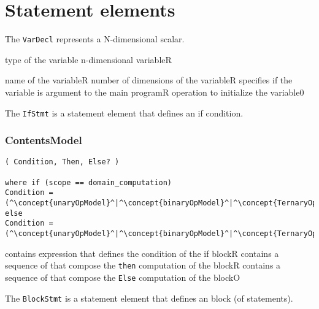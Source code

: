 \section{Statement elements}


The {\tt VarDecl} represents a N-dimensional scalar.

\begin{HIRChildElements}
	{type of the variable n-dimensional variable}{R}
\end{HIRChildElements}

\begin{HIRAttributes}
	{name of the variable}{R}
	{number of dimensions of the variable}{R}
    {specifies if the variable is argument to the main program}{R}
	{operation to initialize the variable}{0}
\end{HIRAttributes}

The {\tt IfStmt} is a statement element that defines an if condition.

\subsubsection*{ContentsModel}{}

\begin{lstlisting}[style=default,frame=none]
( Condition, Then, Else? )

where if (scope == domain_computation)
Condition = (^\concept{unaryOpModel}^|^\concept{binaryOpModel}^|^\concept{TernaryOp}^|^\concept{FieldAccess}^|^\concept{VarAccess}^|^\concept{Literal}^|^\irrconcept{NeighbourReduce}^)
else
Condition = (^\concept{unaryOpModel}^|^\concept{binaryOpModel}^|^\concept{TernaryOp}^|^\concept{VarAccess}^|^\concept{Literal}^)
\end{lstlisting}

\begin{HIRChildElements}
	{contains expression that defines the condition of the if block}{R}
	{contains a sequence of  that compose the {\tt then} 
	 computation of the block}{R}
	{contains a sequence of  that compose the {\tt Else} 
	 computation of the block}{O}
\end{HIRChildElements}

The {\tt BlockStmt} is a statement element that defines an block (of statements).

